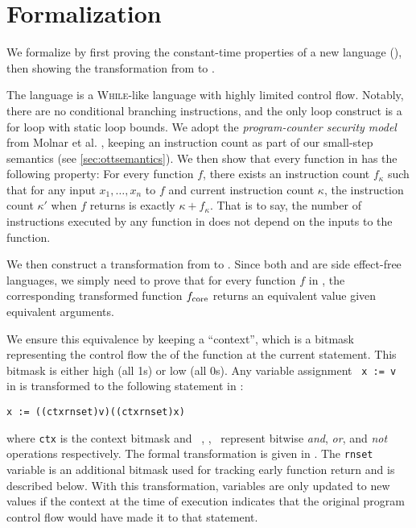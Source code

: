 \section{Formalization}
\label{sec:formalization}

We formalize \constc by first proving the constant-time properties of a new
language (\ccore), then showing the transformation from \constc to \ccore.

The language \ccore is a \textsc{While}-like language with highly limited
control flow. Notably, there are no conditional branching instructions, and the
only loop construct is a for loop with static loop bounds. We adopt the
\emph{program-counter security model} from Molnar et al. \cite{molnar2005},
keeping an instruction count as part of our small-step semantics (see
\autoref{sec:ottsemantics}). We then show that every function in \ccore has the
following property: For every function $f$, there exists an instruction count
$f_\kappa$ such that for any input $x_1,\dots,x_n$ to $f$ and current
instruction count $\kappa$, the instruction count $\kappa'$ when $f$ returns is
exactly $\kappa + f_\kappa$. That is to say, the number of instructions executed
by any function in \ccore does not depend on the inputs to the function.

We then construct a transformation from \constc to \ccore. Since both \ccore and
\constc are side effect-free languages, we simply need to prove that for every
function $f$ in \constc, the corresponding transformed function
$f_{\textnormal{core}}$ returns an equivalent value given equivalent arguments.

We ensure this equivalence by keeping a ``context'', which is a bitmask
representing the control flow the of the function at the current statement. This
bitmask is either high (all 1s) or low (all 0s).  Any variable assignment
~\texttt{x := v}~ in \constc is transformed to the following statement in
\ccore:
\begin{center}
  \texttt{x := ((ctx\bandx rnset)\bandx v)\borx(\bnot (ctx\bandx rnset)\bandx x)}
\end{center}
where \texttt{ctx} is the context bitmask and ~\band, \bor, \bnot\ represent
bitwise \emph{and}, \emph{or}, and \emph{not} operations respectively. The formal transformation is given in . The
\texttt{rnset} variable is an additional bitmask used for tracking early
function return and is described below.  With this transformation, variables are
only updated to new values if the context at the time of execution indicates
that the original program control flow would have made it to that statement.

